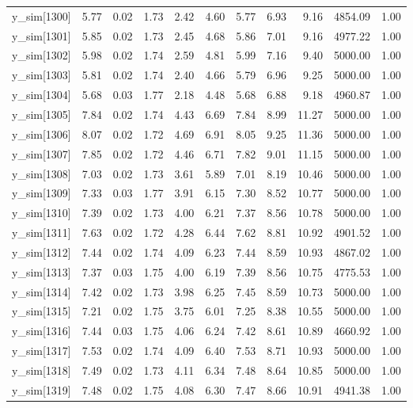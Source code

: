 \begin{table}[ht]
\begin{tabular}{rrrrrrrrrrr}
  y\_sim[1300] & 5.77 & 0.02 & 1.73 & 2.42 & 4.60 & 5.77 & 6.93 & 9.16 & 4854.09 & 1.00 \\ 
  y\_sim[1301] & 5.85 & 0.02 & 1.73 & 2.45 & 4.68 & 5.86 & 7.01 & 9.16 & 4977.22 & 1.00 \\ 
  y\_sim[1302] & 5.98 & 0.02 & 1.74 & 2.59 & 4.81 & 5.99 & 7.16 & 9.40 & 5000.00 & 1.00 \\ 
  y\_sim[1303] & 5.81 & 0.02 & 1.74 & 2.40 & 4.66 & 5.79 & 6.96 & 9.25 & 5000.00 & 1.00 \\ 
  y\_sim[1304] & 5.68 & 0.03 & 1.77 & 2.18 & 4.48 & 5.68 & 6.88 & 9.18 & 4960.87 & 1.00 \\ 
  y\_sim[1305] & 7.84 & 0.02 & 1.74 & 4.43 & 6.69 & 7.84 & 8.99 & 11.27 & 5000.00 & 1.00 \\ 
  y\_sim[1306] & 8.07 & 0.02 & 1.72 & 4.69 & 6.91 & 8.05 & 9.25 & 11.36 & 5000.00 & 1.00 \\ 
  y\_sim[1307] & 7.85 & 0.02 & 1.72 & 4.46 & 6.71 & 7.82 & 9.01 & 11.15 & 5000.00 & 1.00 \\ 
  y\_sim[1308] & 7.03 & 0.02 & 1.73 & 3.61 & 5.89 & 7.01 & 8.19 & 10.46 & 5000.00 & 1.00 \\ 
  y\_sim[1309] & 7.33 & 0.03 & 1.77 & 3.91 & 6.15 & 7.30 & 8.52 & 10.77 & 5000.00 & 1.00 \\ 
  y\_sim[1310] & 7.39 & 0.02 & 1.73 & 4.00 & 6.21 & 7.37 & 8.56 & 10.78 & 5000.00 & 1.00 \\ 
  y\_sim[1311] & 7.63 & 0.02 & 1.72 & 4.28 & 6.44 & 7.62 & 8.81 & 10.92 & 4901.52 & 1.00 \\ 
  y\_sim[1312] & 7.44 & 0.02 & 1.74 & 4.09 & 6.23 & 7.44 & 8.59 & 10.93 & 4867.02 & 1.00 \\ 
  y\_sim[1313] & 7.37 & 0.03 & 1.75 & 4.00 & 6.19 & 7.39 & 8.56 & 10.75 & 4775.53 & 1.00 \\ 
  y\_sim[1314] & 7.42 & 0.02 & 1.73 & 3.98 & 6.25 & 7.45 & 8.59 & 10.73 & 5000.00 & 1.00 \\ 
  y\_sim[1315] & 7.21 & 0.02 & 1.75 & 3.75 & 6.01 & 7.25 & 8.38 & 10.55 & 5000.00 & 1.00 \\ 
  y\_sim[1316] & 7.44 & 0.03 & 1.75 & 4.06 & 6.24 & 7.42 & 8.61 & 10.89 & 4660.92 & 1.00 \\ 
  y\_sim[1317] & 7.53 & 0.02 & 1.74 & 4.09 & 6.40 & 7.53 & 8.71 & 10.93 & 5000.00 & 1.00 \\ 
  y\_sim[1318] & 7.49 & 0.02 & 1.73 & 4.11 & 6.34 & 7.48 & 8.64 & 10.85 & 5000.00 & 1.00 \\ 
  y\_sim[1319] & 7.48 & 0.02 & 1.75 & 4.08 & 6.30 & 7.47 & 8.66 & 10.91 & 4941.38 & 1.00 \\ 

\end{tabular}
\end{table}
